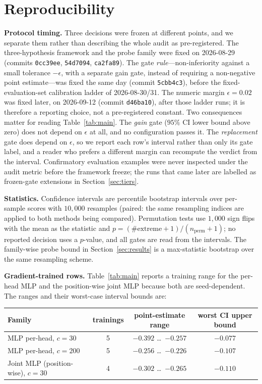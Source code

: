 \documentclass{article} %
\begin{document}
\section{Reproducibility}
\label{app:repro}
\textbf{Protocol timing.} Three decisions were frozen at different points, and
we separate them rather than describing the whole audit as pre-registered. The
three-hypothesis framework and the probe family were fixed on 2026-08-29
(commits \texttt{0cc39ee}, \texttt{54d7094}, \texttt{ca2fa89}). The gate
\emph{rule}---non-inferiority against a small tolerance $-\epsilon$, with a
separate gain gate, instead of requiring a non-negative point estimate---was
fixed the same day (commit \texttt{5cbb4c3}), before the fixed-evaluation-set
calibration ladder of 2026-08-30/31. The numeric margin $\epsilon{=}0.02$ was
fixed later, on 2026-09-12 (commit \texttt{d46ba10}), after those ladder runs;
it is therefore a reporting choice, not a pre-registered constant. Two
consequences matter for reading Table~\ref{tab:main}. The \emph{gain} gate
($95\%$ CI lower bound above zero) does not depend on $\epsilon$ at all, and no
configuration passes it. The \emph{replacement} gate does depend on $\epsilon$,
so we report each row's interval rather than only its gate label, and a reader
who prefers a different margin can recompute the verdict from the interval.
Confirmatory evaluation examples were never inspected under the audit metric
before the framework freeze; the runs that came later are labelled as
frozen-gate extensions in Section~\ref{sec:tiers}.

\textbf{Statistics.} Confidence intervals are percentile bootstrap intervals
over per-sample scores with $10{,}000$ resamples (paired: the same resampling
indices are applied to both methods being compared). Permutation tests use
$1{,}000$ sign flips with the mean as the statistic and
$p=(\#\text{extreme}+1)/(n_{\text{perm}}+1)$; no reported decision uses a
$p$-value, and all gates are read from the intervals. The family-wise probe
bound in Section~\ref{sec:results} is a max-statistic bootstrap over the same
resampling scheme.

\textbf{Gradient-trained rows.} Table~\ref{tab:main} reports a training range
for the per-head MLP and the position-wise joint MLP because both are
seed-dependent. The ranges and their worst-case interval bounds are:

\begin{center}
\footnotesize
\begin{tabular}{lccc}
\toprule
Family & trainings & point-estimate range & worst CI upper bound \\
\midrule
MLP per-head, $c{=}30$ & 5 & $-0.392$ \dots\ $-0.257$ & $-0.077$ \\
MLP per-head, $c{=}200$ & 5 & $-0.256$ \dots\ $-0.226$ & $-0.107$ \\
Joint MLP (position-wise), $c{=}30$ & 4 & $-0.302$ \dots\ $-0.265$ & $-0.110$ \\
\bottomrule
\end{tabular}
\end{center}
\end{document}
